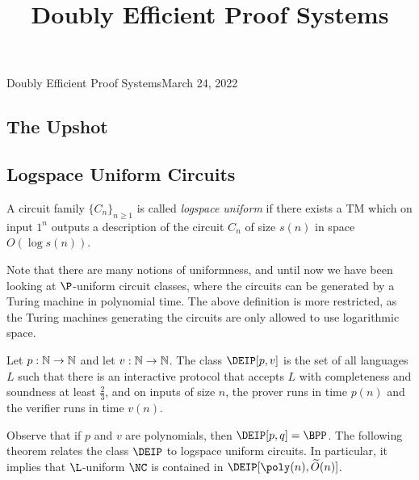 
\newcommand{\F}{\mathbb{F}}
\newcommand{\fH}{\mathbb{H}}


\title{Doubly Efficient Proof Systems}


\begin{lecture}{9}{Doubly Efficient Proof Systems}{March 24, 2022}\label{lec:09}
\maketitle

\subsection*{The Upshot}%

\subsection{Logspace Uniform Circuits}

\begin{definition}\label{def:logspaceuniform}
  A circuit family $\{C_n\}_{n \geq 1}$ is called \emph{logspace uniform} if
  there exists a TM which on input $1^n$ outputs a description of the circuit
  $C_n$ of size $s(n)$ in space $O(\log s(n))$.
\end{definition}

Note that there are many notions of uniformness, and until now we have been
looking at $\P$-uniform circuit classes, where the circuits can be generated by
a Turing machine in polynomial time. The above definition is more restricted,
as the Turing machines generating the circuits are only allowed to use
logarithmic space.

\begin{definition}
  Let $p : \mathbb{N} \to \mathbb{N}$ and let $v : \mathbb{N} \to \mathbb{N}$. The class $\DEIP[p, v]$ is the
  set of all languages $L$ such that there is an interactive protocol that
  accepts $L$ with completeness and soundness at least $\frac23$, and on inputs
  of size $n$, the prover runs in time $p(n)$ and the verifier runs in time
  $v(n)$.
\end{definition}

Observe that if $p$ and $v$ are polynomials, then $\DEIP[p, q] = \BPP$. The
following theorem relates the class $\DEIP$ to logspace uniform circuits. In
particular, it implies that $\L$-uniform $\NC$ is contained in $\DEIP[\poly(n),
\widetilde{O}(n)]$.


\end{lecture}
